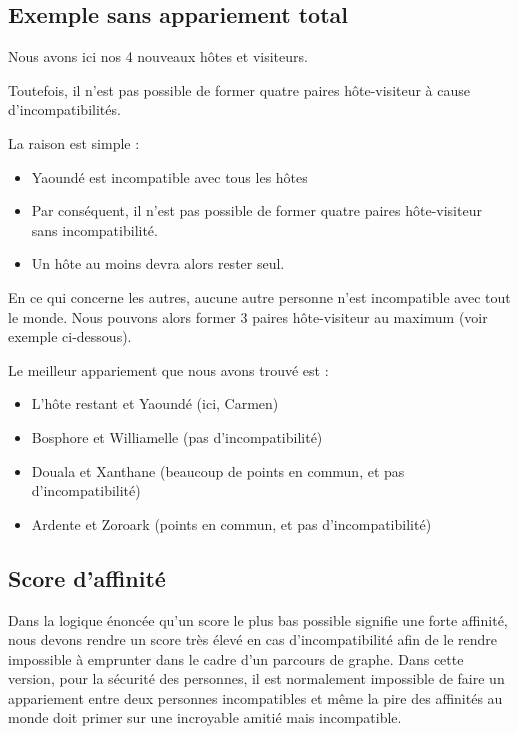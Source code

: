 \documentclass{mytex}
\begin{document}
\subsection{Exemple sans appariement total}

Nous avons ici nos 4 nouveaux hôtes et visiteurs.


Toutefois, il n'est pas possible de former quatre paires hôte-visiteur à cause d'incompatibilités.

La raison est simple :

\begin{itemize}
    \item Yaoundé est incompatible avec tous les hôtes 
    \item Par conséquent, il n'est pas possible de former quatre paires hôte-visiteur sans incompatibilité.
    \item Un hôte au moins devra alors rester seul.
\end{itemize}

En ce qui concerne les autres, aucune autre personne n'est incompatible avec tout le monde.
Nous pouvons alors former 3 paires hôte-visiteur au maximum (voir exemple ci-dessous).


Le meilleur appariement que nous avons trouvé est :

\begin{itemize}
    \item L'hôte restant et Yaoundé (ici, Carmen)
    \item Bosphore et Williamelle (pas d'incompatibilité)
    \item Douala et Xanthane (beaucoup de points en commun, et pas d'incompatibilité)
    \item Ardente et Zoroark (points en commun, et pas d'incompatibilité)
\end{itemize}

\subsection{Score d'affinité}


Dans la logique énoncée qu'un score le plus bas possible signifie une forte affinité, nous devons rendre un score très élevé en cas d'incompatibilité afin de le rendre impossible à emprunter dans le cadre d'un parcours de graphe.
Dans cette version, pour la sécurité des personnes, il est normalement impossible de faire un appariement entre deux personnes incompatibles et même la pire des affinités au monde doit primer sur une incroyable amitié mais incompatible.
\end{document}

